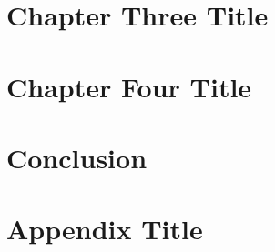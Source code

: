 \documentclass[11pt,oneside,a4paper]{report}
\begin{document}
\chapter{Chapter Three Title}


\chapter{Chapter Four Title}


\chapter{Conclusion}


{}


\appendix
\chapter{Appendix Title}

\end{document}
